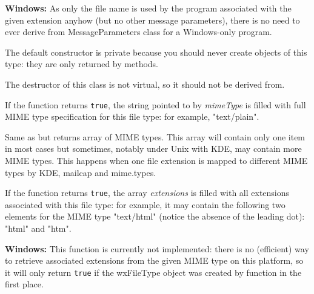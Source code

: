 {\bf Windows:} As only the file name is used by the program associated with the
given extension anyhow (but no other message parameters), there is no need to
ever derive from MessageParameters class for a Windows-only program.

\label{wxfiletypewxfiletype}


The default constructor is private because you should never create objects of
this type: they are only returned by  methods.

\label{wxfiletypedtor}


The destructor of this class is not virtual, so it should not be derived from.

\label{wxfiletypegetmimetype}


If the function returns {\tt true}, the string pointed to by {\it mimeType} is filled
with full MIME type specification for this file type: for example, "text/plain".

\label{wxfiletypegetmimetypes}


Same as  but returns array of MIME
types. This array will contain only one item in most cases but sometimes,
notably under Unix with KDE, may contain more MIME types. This happens when
one file extension is mapped to different MIME types by KDE, mailcap and
mime.types.

\label{wxfiletypegetextensions}


If the function returns {\tt true}, the array {\it extensions} is filled
with all extensions associated with this file type: for example, it may
contain the following two elements for the MIME type "text/html" (notice the
absence of the leading dot): "html" and "htm".

{\bf Windows:} This function is currently not implemented: there is no
(efficient) way to retrieve associated extensions from the given MIME type on
this platform, so it will only return {\tt true} if the wxFileType object was created
by  
function in the first place.

